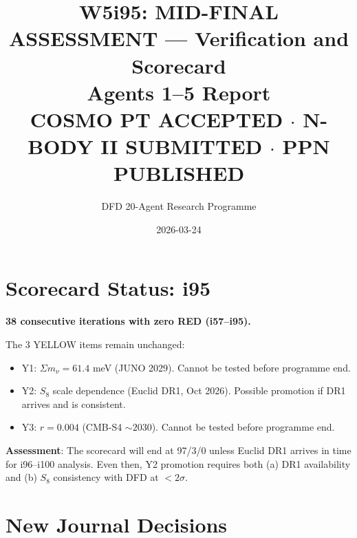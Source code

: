 \documentclass[11pt,a4paper]{article}
\title{W5i95: MID-FINAL ASSESSMENT --- Verification and Scorecard\\[6pt]
\large Agents 1--5 Report\\[3pt]
\normalsize COSMO PT ACCEPTED $\cdot$ N-BODY II SUBMITTED $\cdot$ PPN PUBLISHED}
\author{DFD 20-Agent Research Programme}
\date{2026-03-24}
\begin{document}
\maketitle

\section{Scorecard Status: i95}

\begin{tcolorbox}[colback=green!5!white, colframe=dfdgreen, title=\textbf{Scorecard: 97/3/0 (UNCHANGED)}]
\textbf{38 consecutive iterations with zero RED (i57--i95).}

The 3 YELLOW items remain unchanged:
\begin{itemize}[nosep]
\item Y1: $\Sigma m_\nu = 61.4$ meV (JUNO 2029). Cannot be tested before programme end.
\item Y2: $S_8$ scale dependence (Euclid DR1, Oct 2026). Possible promotion if DR1 arrives and is consistent.
\item Y3: $r = 0.004$ (CMB-S4 $\sim 2030$). Cannot be tested before programme end.
\end{itemize}

\textbf{Assessment}: The scorecard will end at 97/3/0 unless Euclid DR1 arrives in time for i96--i100 analysis. Even then, Y2 promotion requires both (a) DR1 availability and (b) $S_8$ consistency with DFD at $< 2\sigma$.
\end{tcolorbox}

\section{New Journal Decisions}
\end{document}
